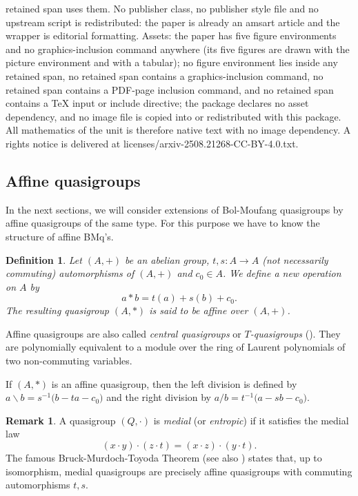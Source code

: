 \documentclass[10pt,a4paper]{amsart}
\newtheorem{definition}[theorem]{Definition}
\theoremstyle{definition}
\newtheorem{remark}[theorem]{Remark}
\begin{document}
retained span uses them. No publisher class, no publisher style file and no upstream script is redistributed: the paper is already an amsart article and the wrapper is editorial formatting. Assets: the paper has five figure environments and no graphics-inclusion command anywhere (its five figures are drawn with the picture environment and with a tabular); no figure environment lies inside any retained span, no retained span contains a graphics-inclusion command, no retained span contains a PDF-page inclusion command, and no retained span contains a TeX input or include directive; the package declares no asset dependency, and no image file is copied into or redistributed with this package. All mathematics of the unit is therefore native text with no image dependency. A rights notice is delivered at licenses/arxiv-2508.21268-CC-BY-4.0.txt.
\setcounter{section}{2}\setcounter{subsection}{2}\setcounter{subsubsection}{0}\setcounter{theorem}{1}
\subsection{Affine quasigroups}\label{Ss:AMBMQ} %
In the next sections, we will consider extensions of Bol-Moufang quasigroups by affine quasigroups of the same type. For this purpose we have to know the structure of affine BMq's. 
\begin{definition}
Let $(A,+)$ be an abelian group, $t,s\colon A\rightarrow A$ (not necessarily commuting) automorphisms of $(A,+)$ and $c_0\in A$. We define a new operation on $A$ by
\begin{equation}
a\ast b=t(a)+s(b)+c_0.    
\end{equation}
The resulting quasigroup $(A,\ast)$ is said to be \emph{affine} over $(A,+)$.
\end{definition}
Affine quasigroups are also called \emph{central quasigroups} or \emph{$T$-quasigroups} (\cite[Section 1.4.4.3]{Shch}). They are polynomially equivalent to a module over the ring of Laurent polynomials of two non-commuting variables.

If $(A,\ast)$ is an affine quasigroup, then the left division is defined by $a\backslash b=s^{-1}\big(b-ta-c_0\big)$ and the right division by $a/ b= t^{-1}\big(a-sb-c_0\big)$. 

\begin{remark}
A quasigroup $(Q,\cdot)$ is \emph{medial} (or \emph{entropic}) if it satisfies the medial law
\begin{equation}
(x\cdot y)\cdot (z\cdot t)=(x\cdot z)\cdot (y\cdot t).
\end{equation}
The famous Bruck-Murdoch-Toyoda Theorem \cite{Bruc,Mur,Toy} (see also \cite[Theorem 2.65]{Shch}) states that, up to isomorphism, medial quasigroups are precisely affine quasigroups with commuting automorphisms $t,s$.
\end{remark}
\end{document}
